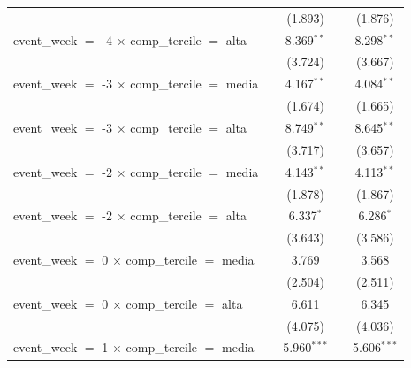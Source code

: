 \begin{tabular}{lcccc}
                                                           &                & (1.893)       &              & (1.876)\\   
   event\_week $=$ -4 $\times$ comp\_tercile $=$ alta      &                & 8.369$^{**}$  &              & 8.298$^{**}$\\   
                                                           &                & (3.724)       &              & (3.667)\\   
   event\_week $=$ -3 $\times$ comp\_tercile $=$ media     &                & 4.167$^{**}$  &              & 4.084$^{**}$\\   
                                                           &                & (1.674)       &              & (1.665)\\   
   event\_week $=$ -3 $\times$ comp\_tercile $=$ alta      &                & 8.749$^{**}$  &              & 8.645$^{**}$\\   
                                                           &                & (3.717)       &              & (3.657)\\   
   event\_week $=$ -2 $\times$ comp\_tercile $=$ media     &                & 4.143$^{**}$  &              & 4.113$^{**}$\\   
                                                           &                & (1.878)       &              & (1.867)\\   
   event\_week $=$ -2 $\times$ comp\_tercile $=$ alta      &                & 6.337$^{*}$   &              & 6.286$^{*}$\\   
                                                           &                & (3.643)       &              & (3.586)\\   
   event\_week $=$ 0 $\times$ comp\_tercile $=$ media      &                & 3.769         &              & 3.568\\   
                                                           &                & (2.504)       &              & (2.511)\\   
   event\_week $=$ 0 $\times$ comp\_tercile $=$ alta       &                & 6.611         &              & 6.345\\   
                                                           &                & (4.075)       &              & (4.036)\\   
   event\_week $=$ 1 $\times$ comp\_tercile $=$ media      &                & 5.960$^{***}$ &              & 5.606$^{***}$\\   

\end{tabular}
